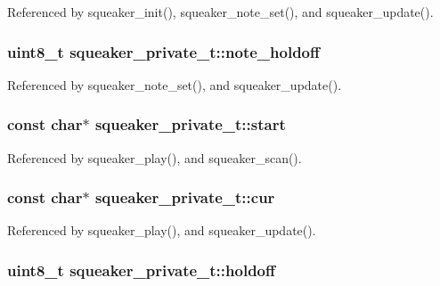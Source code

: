 Referenced by squeaker\_\-init(), squeaker\_\-note\_\-set(), and squeaker\_\-update().\hypertarget{structsqueaker__private__t_5d8ae288cd1d6f1a51a1447510119317}{
\subsubsection{\setlength{\rightskip}{0pt plus 5cm}uint8\_\-t {\bf squeaker\_\-private\_\-t::note\_\-holdoff}}}
\label{structsqueaker__private__t_5d8ae288cd1d6f1a51a1447510119317}




Referenced by squeaker\_\-note\_\-set(), and squeaker\_\-update().\hypertarget{structsqueaker__private__t_6f45e1943e6f0b8ee67117abd6a6b62b}{
\subsubsection{\setlength{\rightskip}{0pt plus 5cm}const char$\ast$ {\bf squeaker\_\-private\_\-t::start}}}
\label{structsqueaker__private__t_6f45e1943e6f0b8ee67117abd6a6b62b}




Referenced by squeaker\_\-play(), and squeaker\_\-scan().\hypertarget{structsqueaker__private__t_21a7eea0a8ccac207baefae4d81865f5}{
\subsubsection{\setlength{\rightskip}{0pt plus 5cm}const char$\ast$ {\bf squeaker\_\-private\_\-t::cur}}}
\label{structsqueaker__private__t_21a7eea0a8ccac207baefae4d81865f5}




Referenced by squeaker\_\-play(), and squeaker\_\-update().\hypertarget{structsqueaker__private__t_69ca1b8a142c2a4ac543ede5b8beb06b}{
\subsubsection{\setlength{\rightskip}{0pt plus 5cm}uint8\_\-t {\bf squeaker\_\-private\_\-t::holdoff}}}
\label{structsqueaker__private__t_69ca1b8a142c2a4ac543ede5b8beb06b}




